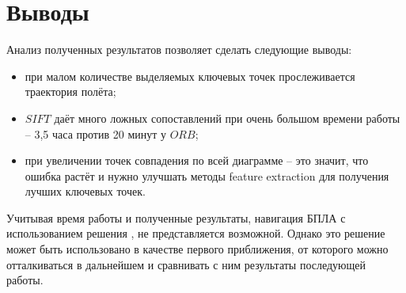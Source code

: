 \section{Выводы}

Анализ полученных результатов позволяет сделать следующие выводы:
\begin{itemize}
    \item при малом количестве выделяемых ключевых точек прослеживается траектория полёта;
    \item $SIFT$ даёт много ложных сопоставлений при очень большом времени работы -- 3,5 часа против 20 минут у $ORB$;
    \item при увеличении точек совпадения  по всей диаграмме -- это значит, что ошибка растёт и нужно улучшать методы feature extraction для получения лучших ключевых точек.
\end{itemize}

Учитывая время работы и полученные результаты, навигация БПЛА с использованием решения , не представляется возможной. Однако это решение может быть использовано в качестве первого приближения, от которого можно отталкиваться в дальнейшем и сравнивать с ним результаты последующей работы.

\newpage
